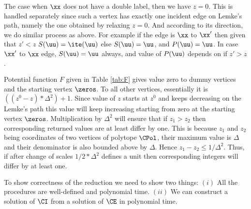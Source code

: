 The case when $\xx$ does not have a double label, then we have $z=0$. This is handled separately since such a vertex has exactly one incident edge on Lemke's path, namely the one obtained by relaxing $z=0$. And according to its direction, we do similar process as above. For example if the edge is $\xx$ to $\xx'$ then given that $z'<z$ $S(\uu)=\ite(\uu)$ else $S(\uu)=\uu$, and $P(\uu)=\uu$. In case $\xx'$ to $\xx$ edge, $S(\uu)=\uu$ always, and value of $P(\uu)$ depends on if $z'>z$.


%
\medskip

Potential function $F$ given in Table \ref{tab:F} gives value zero to dummy vertices and the starting vertex $\zeros$. To all other vertices, essentially it is $((z^0-z) * \Delta^2)+1$. Since value of $z$ starts at $z^0$ and keeps decreasing on the Lemke's path this value will keep increasing starting from zero at the starting vertex $\zeros$. Multiplication by $\Delta^2$ will ensure that if $z_1>z_2$ then corresponding returned values are at least differ by one. This is because $z_1$ and $z_2$ being coordinates of two vertices of polytope $\CPol$, their maximum value is $\Delta$ and their denominator is also bounded above by $\Delta$. Hence $z_1-z_2\le 1/\Delta^2$. Thus, if after change of scales $1/2*\Delta^2$ defines a unit then corresponding integers will differ by at least one. 

To show correctness of the reduction we need to show two things: $(i)$ All the procedures are well-defined and polynomial time. $(ii)$ We can construct a solution of $\CI$ from a solution of $\CE$ in polynomial time. 

